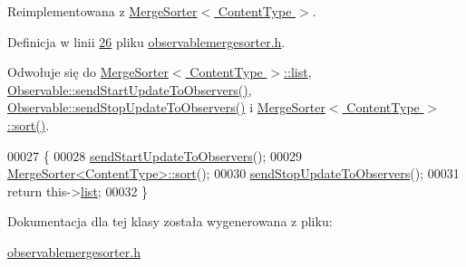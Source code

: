 Reimplementowana z \hyperlink{class_merge_sorter_a4c0c1cf429c3d20dacea113c9669528a}{Merge\-Sorter$<$ Content\-Type $>$}.



Definicja w linii \hyperlink{observablemergesorter_8h_source_l00026}{26} pliku \hyperlink{observablemergesorter_8h_source}{observablemergesorter.\-h}.



Odwołuje się do \hyperlink{mergesorter_8h_source_l00021}{Merge\-Sorter$<$ Content\-Type $>$\-::list}, \hyperlink{observable_8h_source_l00029}{Observable\-::send\-Start\-Update\-To\-Observers()}, \hyperlink{observable_8h_source_l00039}{Observable\-::send\-Stop\-Update\-To\-Observers()} i \hyperlink{mergesorter_8h_source_l00096}{Merge\-Sorter$<$ Content\-Type $>$\-::sort()}.


\begin{DoxyCode}
00027         \{
00028                 \hyperlink{class_observable_a78df64057f152342a43f27979186a6ba}{sendStartUpdateToObservers}();
00029                 \hyperlink{class_merge_sorter_a4c0c1cf429c3d20dacea113c9669528a}{MergeSorter<ContentType>::sort}();
00030                 \hyperlink{class_observable_a16f75ed1514a0cb7526b5a5d2b7ca7c6}{sendStopUpdateToObservers}();
00031                 \textcolor{keywordflow}{return} this->\hyperlink{class_merge_sorter_a2fdeadd95d226a04243bab8b5104e324}{list};
00032         \}
\end{DoxyCode}


Dokumentacja dla tej klasy została wygenerowana z pliku\-:\begin{DoxyCompactItemize}
\item 
\hyperlink{observablemergesorter_8h}{observablemergesorter.\-h}\end{DoxyCompactItemize}
